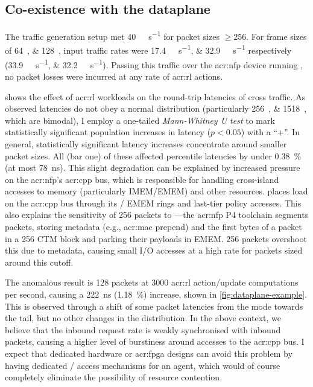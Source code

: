\subsection{Co-existence with the dataplane}
The traffic generation setup met \qty{40}{\giga\bit\per\second} for packet sizes $\ge$\qty{256}{\byte}.
For frame sizes of \qtylist{64;128}{\byte}, input traffic rates were \qtylist{17.4;32.9}{\giga\bit\per\second} respectively (\qtylist[per-symbol=p,sticky-per=true]{33.9;32.2}{\mega\packet\per\second}).
Passing this traffic over the \gls{acr:nfp} device running \approachshort, no packet losses were incurred at any rate of \gls{acr:rl} actions.

 shows the effect of \gls{acr:rl} workloads on the round-trip latencies of cross traffic.
As observed latencies do not obey a normal distribution (particularly \qtylist{256;1518}{\byte}, which are bimodal), I employ a one-tailed \emph{Mann-Whitney U test} to mark statistically significant population increases in latency ($p < 0.05$) with a ``+''.
In general, statistically significant latency increases concentrate around smaller packet sizes.
All (bar one) of these affected  percentile latencies by under \qty{0.38}{\percent} (at most \qty{78}{\nano\second}).
This slight degradation can be explained by increased pressure on the \gls{acr:nfp}'s \gls{acr:cpp} bus, which is responsible for handling cross-island accesses to memory (particularly IMEM/EMEM) and other resources.
\approachshort{} places load on the \gls{acr:cpp} bus through its \inring{}/\outring{} EMEM rings and last-tier policy accesses.
This also explains the sensitivity of \qty{256}{\byte} packets to \approachshort{}---the \gls{acr:nfp} P4 toolchain segments packets, storing metadata (e.g., \gls{acr:mac} prepend) and the first bytes of a packet in a \qty{256}{\byte} CTM block and parking their payloads in EMEM.
\qty{256}{\byte} packets overshoot this due to metadata, causing small I/O accesses at a high rate for packets sized around this cutoff.

The anomalous result is \qty{128}{\byte} packets at \num{3000} \gls{acr:rl} action/update computations per second, causing a \qty{222}{\nano\second} (\qty{1.18}{\percent}) increase, shown in \cref{fig:dataplane-example}.
This is observed through a shift of some packet latencies from the mode towards the tail, but no other changes in the distribution.
In the above context, we believe that the inbound request rate is weakly synchronised with inbound packets, causing a higher level of burstiness around accesses to the \gls{acr:cpp} bus.
I expect that dedicated hardware or \gls{acr:fpga} designs can avoid this problem by having dedicated \inring{}/\outring{} access mechanisms for an \approachshort{} agent, which would of course completely eliminate the possibility of resource contention.

